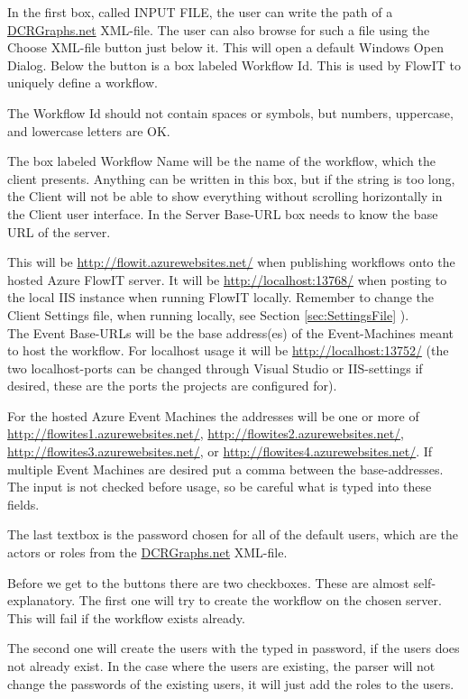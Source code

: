 In the first box, called INPUT FILE, the user can write the path of a \url{DCRGraphs.net} XML-file. The user can also browse for such a file using the Choose XML-file button just below it. This will open a default Windows Open Dialog. Below the button is a box labeled Workflow Id. This is used by FlowIT to uniquely define a workflow. 

The Workflow Id should not contain spaces or symbols, but numbers, uppercase, and lowercase letters are OK.

The box labeled Workflow Name will be the name of the workflow, which the client presents. Anything can be written in this box, but if the string is too long, the Client will not be able to show everything without scrolling horizontally in the Client user interface.
In the Server Base-URL box needs to know the base URL of the server. 

This will be \url{http://flowit.azurewebsites.net/} when publishing workflows onto the hosted Azure FlowIT server. It will be \url{http://localhost:13768/} when posting to the local IIS instance when running FlowIT locally. Remember to change the Client Settings file, when running locally, see Section \ref{sec:SettingsFile} ).\\

The Event Base-URLs will be the base address(es) of the Event-Machines meant to host the workflow. For localhost usage it will be \url{http://localhost:13752/} (the two localhost-ports can be changed through Visual Studio or IIS-settings if desired, these are the ports the projects are configured for). 

For the hosted Azure Event Machines the addresses will be one or more of \url{http://flowites1.azurewebsites.net/}, \url{http://flowites2.azurewebsites.net/}, \url{http://flowites3.azurewebsites.net/}, or \url{http://flowites4.azurewebsites.net/}. If multiple Event Machines are desired put a comma between the base-addresses. The input is not checked before usage, so be careful what is typed into these fields.

The last textbox is the password chosen for all of the default users, which are the actors or roles from the \url{DCRGraphs.net} XML-file.

Before we get to the buttons there are two checkboxes. These are almost self-explanatory. The first one will try to create the workflow on the chosen server. This will fail if the workflow exists already. 

The second one will create the users with the typed in password, if the users does not already exist. In the case where the users are existing, the parser will not change the passwords of the existing users, it will just add the roles to the users.

